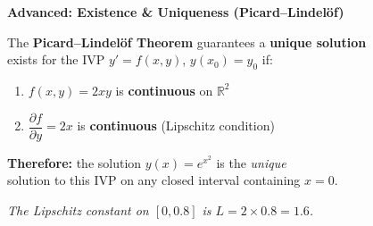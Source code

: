\documentclass[12pt]{beamer}
\begin{document}

\begin{frame}{\textbf{Advanced: Existence \& Uniqueness (Picard--Lindel\"of)}}
  \begin{center}
    \vfill
    The \textbf{Picard--Lindel\"of Theorem} guarantees a \textbf{unique solution}\\[0.3em]
    exists for the IVP $y' = f(x,y)$, $y(x_0) = y_0$ if:

    \vspace{1em}
    \begin{enumerate}
      \item $f(x,y) = 2xy$ is \textbf{continuous} on $\mathbb{R}^2$ \;\textcolor{okgreen}{\checkmark}
      \item $\dfrac{\partial f}{\partial y} = 2x$ is \textbf{continuous} (Lipschitz condition) \;\textcolor{okgreen}{\checkmark}
    \end{enumerate}

    \vspace{1.5em}
    \textbf{Therefore:}\; the solution $y(x) = e^{x^2}$ is the \textit{unique}\\[0.3em]
    solution to this IVP on any closed interval containing $x = 0$.

    \vspace{1em}
    \textit{The Lipschitz constant on $[0, 0.8]$ is $L = 2 \times 0.8 = 1.6$.}
    \vfill
  \end{center}
\end{frame}
\end{document}
